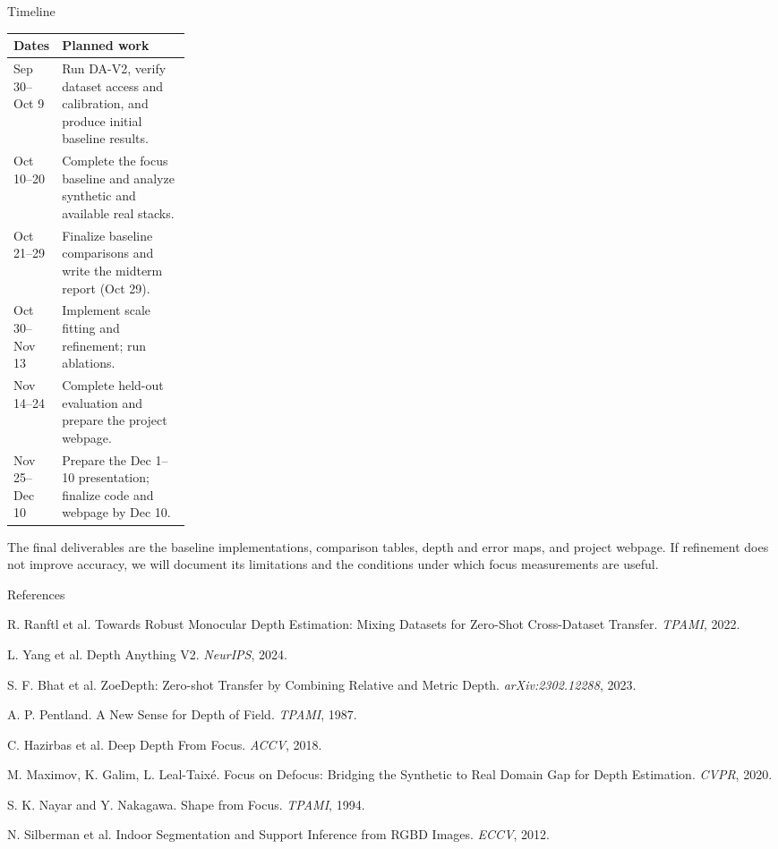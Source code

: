 \documentclass[11pt]{article}
\begin{document}
\begin{proposalbox}{Timeline}
\begin{tabularx}{\linewidth}{@{}p{0.23\linewidth}X@{}}
\toprule
\textbf{Dates} & \textbf{Planned work}\\
\midrule
Sep 30--Oct 9 & Run DA-V2, verify dataset access and calibration, and produce initial baseline results.\\
Oct 10--20 & Complete the focus baseline and analyze synthetic and available real stacks.\\
Oct 21--29 & Finalize baseline comparisons and write the midterm report (Oct 29).\\
Oct 30--Nov 13 & Implement scale fitting and refinement; run ablations.\\
Nov 14--24 & Complete held-out evaluation and prepare the project webpage.\\
Nov 25--Dec 10 & Prepare the Dec 1--10 presentation; finalize code and webpage by Dec 10.\\
\bottomrule
\end{tabularx}
\par\smallskip
The final deliverables are the baseline implementations, comparison tables, depth and error maps, and project webpage. If refinement does not improve accuracy, we will document its limitations and the conditions under which focus measurements are useful.
\end{proposalbox}

\begin{proposalbox}{References}
\begin{multicols}{2}
\fontsize{8}{9.5}\selectfont
\begin{enumerate}[label={[\arabic*]},leftmargin=1.7em,itemsep=2pt,topsep=0pt]
\item R. Ranftl et al. Towards Robust Monocular Depth Estimation: Mixing Datasets for Zero-Shot Cross-Dataset Transfer. \emph{TPAMI}, 2022.
\item L. Yang et al. Depth Anything V2. \emph{NeurIPS}, 2024.
\item S. F. Bhat et al. ZoeDepth: Zero-shot Transfer by Combining Relative and Metric Depth. \emph{arXiv:2302.12288}, 2023.
\item A. P. Pentland. A New Sense for Depth of Field. \emph{TPAMI}, 1987.
\item C. Hazirbas et al. Deep Depth From Focus. \emph{ACCV}, 2018.
\item M. Maximov, K. Galim, L. Leal-Taix\'e. Focus on Defocus: Bridging the Synthetic to Real Domain Gap for Depth Estimation. \emph{CVPR}, 2020.
\item S. K. Nayar and Y. Nakagawa. Shape from Focus. \emph{TPAMI}, 1994.
\item N. Silberman et al. Indoor Segmentation and Support Inference from RGBD Images. \emph{ECCV}, 2012.
\end{enumerate}
\end{multicols}
\end{proposalbox}
\end{document}
